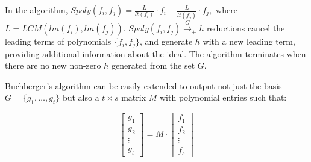 In the algorithm, $Spoly(f_i,f_j) = \frac{L}{lt(f_i)}\cdot f_i - \frac{L}{lt(f_j)}\cdot f_j,
$
 where $L = LCM(lm(f_i),lm(f_j))$.
$Spoly(f_i,f_j)\xrightarrow{G}_+h$ reductions cancel the leading terms
of polynomials $\{f_i,f_j\}$, and generate $h$ with a new leading term,
providing additional information about the ideal. The algorithm
terminates when there are no new non-zero $h$ generated from the set
$G$. 


Buchberger's algorithm can be easily extended to output 
not just the \Grobner basis $G=\{g_1,\dots,g_t\}$ but also a $t\times
s$ matrix $M$ with polynomial entries such that:

\begin{equation}\label{eqn:matrix}
\begin{bmatrix} g_1 \\ g_2 \\ \vdots \\ g_t \end{bmatrix}  =  M \cdot
\begin{bmatrix} f_1 \\ f_2 \\ \vdots \\ f_s \end{bmatrix}
\end{equation}


